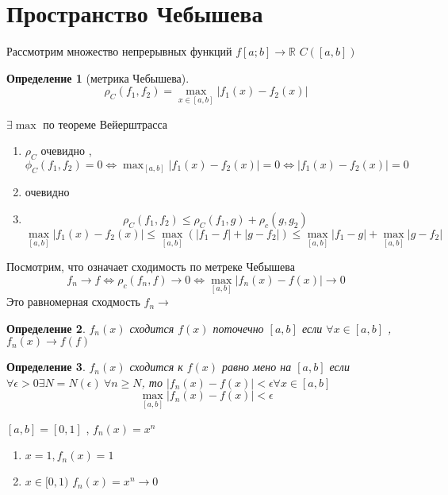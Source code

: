 \documentclass[14pt]{extarticle}
\newtheorem{definition}{Определение}
\begin{document}
\section{Пространство Чебышева}
Рассмотрим множество непрерывных
функций $f[a;b] \to \mathbb{R}$ $C([a,b])$
\begin{definition}[метрика Чебышева]
	\begin{equation}
		\rho_{C}(f_1,f_2) = \max_{x \in [a,b]} |f_1(x) - f_2(x)|
	\end{equation} 
\end{definition}
$\exists  \max$  по теореме Вейерштрасса
\begin{enumerate}
	\item $\rho_{C}$ очевидно , $\phi_{C}(f_1,f_2) = 0 \iff
		\max_{[a,b]}|f_1(x) - f_2(x)| = 0 \iff
		|f_1(x) - f_2(x)| =  0$
	\item очевидно
	\item 
		\begin{equation}
		\rho_{C}(f_1,f_2) \le 
		\rho_{C}(f_1,g) +
		\rho_{c}(g,g_2)
		\end{equation} 
		\begin{equation}
			\max_{[a,b]} |f_1(x) -f_2(x)|
			\le \max_{[a,b]}(|f_1 - f| + |g - f_2|)
			\le \max_{[a,b]} |f_1 - g| + \max_{[ a,b ]} |g-f_2|
		\end{equation} 
\end{enumerate}
Посмотрим, что означает сходимость по метреке  Чебышева
\begin{equation}
f_{n} \to f \iff \rho_{c}(f_{n},f) \to 0
\iff \max_{[a,b]} |f_{n}(x) - f(x)| \to 0
\end{equation} 
Это равномерная сходмость $f_{n}\rightarrow $
\begin{definition}
	$f_{n}(x)$ сходится $f(x)$ 
	поточечно $[a,b]$ если 
	$\forall x \in [a,b] $ , $f_{n}(x) \to f(f)$
\end{definition}
\begin{definition}
	$f_{n}(x) $ сходится к $f(x)$  равно мено на  $[a,b]$
	если  $\forall  \epsilon > 0 \exists  N = N(\epsilon) ~
	\forall n\ge  N$, то 
	$|f_{n}(x) - f(x)| < \epsilon \forall  x \in [a,b]$
	\begin{equation}
		\max_{[a,b]} |f_{n}(x) - f(x)| < \epsilon
	\end{equation} 
\end{definition}
$[a,b] = [0,1]$ , $f_{n}(x) = x^{n}$
 \begin{enumerate}
 	\item $x = 1, f_{n}(x) = 1$
	 \item $x \in [0,1)$   $f_{n}(x) = x^{n} \to 0$
 \end{enumerate}
\end{document}
